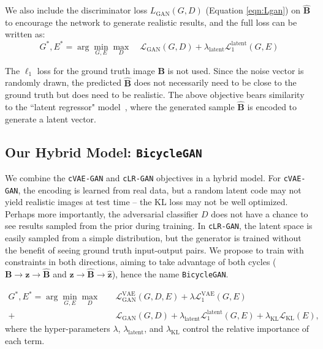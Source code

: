 \documentclass{article}
\newcommand{\cinfogan}{\texttt{cLR-GAN}\xspace}
\newcommand{\cvaegan}{\texttt{cVAE-GAN}\xspace}
\newcommand{\bicycle}{\texttt{BicycleGAN}\xspace} \newcommand{\G}{G\xspace}
\newcommand{\D}{D\xspace}
\newcommand{\E}{E\xspace}
\newcommand{\B}{\mathbf{B}\xspace}
\newcommand{\Bh}{\widehat{\mathbf{B}}\xspace}
\newcommand{\z}{\mathbf{z}\xspace}
\newcommand{\zh}{\widehat{\mathbf{z}}\xspace}
\begin{document}
We also include the discriminator loss $L_{\text{GAN}}(\G,\D)$ (Equation \ref{eqn:Lgan}) on $\Bh$ to encourage the network to generate realistic results, and the full loss can be written as:
\begin{equation}
\G^{*}, \E^{*} = \arg\min_{\G,\E} \max_\D \quad \mathcal{L}_{\text{GAN}}(\G,\D) + \lambda_{\text{latent}} \mathcal{L}_1^{\text{latent}}(\G,\E)
\label{fig:L}
\end{equation}

The $\ell_1$ loss for the ground truth image $\B$ is not used. Since the noise vector is randomly drawn, the predicted $\Bh$ does not necessarily need to be close to the ground truth but does need to be realistic. The above objective bears similarity to the ``latent regressor" model~\citep{donahue2016adversarial,dumoulin2016adversarially,xi2016infogan}, where the generated sample $\Bh$ is encoded to generate a latent vector.

\subsection{Our Hybrid Model: \bicycle}
\label{sec:finalMethod}
We combine the \cvaegan and \cinfogan objectives in a hybrid model. For \cvaegan, the encoding is learned from real data, but a random latent code may not yield realistic images at test time -- the KL loss may not be well optimized. Perhaps more importantly, the adversarial classifier $\D$ does not have a chance to see results sampled from the prior during training. 
In \cinfogan, the latent space is easily sampled from a simple distribution, but the generator is trained without the benefit of seeing ground truth input-output pairs. We propose to train with constraints in both directions, aiming to take advantage of both cycles ($\B \rightarrow \z \rightarrow \widehat{\mathbf{B}}$ and $\z \rightarrow \Bh \rightarrow \zh$), hence the name \bicycle.

\vspace{-3mm}
\begin{equation}
\begin{split}
\G^{*}, \E^{*} = \arg\min_{\G,\E} \max_{\D} \quad  & \mathcal{L}_{\text{GAN}}^{\text{VAE}}(\G,\D,\E) + \lambda \mathcal{L}_1^{\text{VAE}}(\G,\E) \\
+& \mathcal{L}_{\text{GAN}}(\G,\D) + \lambda_{\text{latent}} \mathcal{L}_1^{\text{latent}}(\G,\E) + \lambda_{\text{KL}}\mathcal{L}_{\text{KL}}(\E),
\end{split}
\label{eq:L}
\end{equation}
where the hyper-parameters $\lambda$, $\lambda_{\text{latent}}$, and $\lambda_{\text{KL}}$ control the relative importance of each term. 
\end{document}
